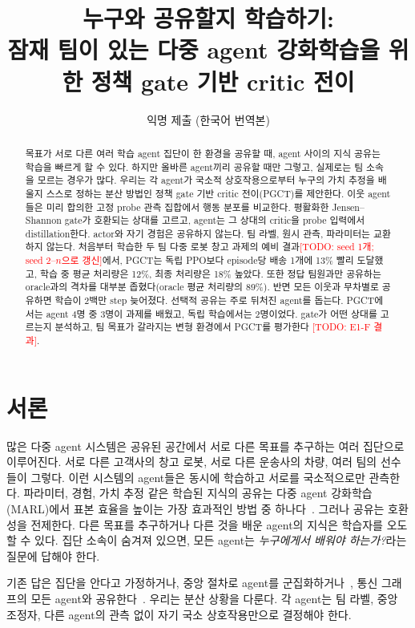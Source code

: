 \documentclass[twocolumn,10pt]{article}
\title{누구와 공유할지 학습하기:\\ 잠재 팀이 있는 다중 agent 강화학습을 위한 정책 gate 기반 critic 전이}
\author{익명 제출 (한국어 번역본)}
\date{}
\newcommand{\todo}[1]{\textcolor{red}{[TODO: #1]}}
\newcommand{\ours}{PGCT}
\begin{document}
\maketitle

\begin{abstract}
목표가 서로 다른 여러 학습 agent 집단이 한 환경을 공유할 때, agent 사이의 지식 공유는 학습을 빠르게 할 수 있다.
하지만 올바른 agent끼리 공유할 때만 그렇고, 실제로는 팀 소속을 모르는 경우가 많다. 우리는 각 agent가 국소적
상호작용으로부터 누구의 가치 추정을 배울지 스스로 정하는 분산 방법인 정책 gate 기반 critic 전이(\ours{})를 제안한다.
이웃 agent들은 미리 합의한 고정 probe 관측 집합에서 행동 분포를 비교한다. 평활화한 Jensen--Shannon gate가 호환되는
상대를 고르고, agent는 그 상대의 critic을 probe 입력에서 distillation한다. actor와 자기 경험은 공유하지 않는다. 팀 라벨,
원시 관측, 파라미터는 교환하지 않는다. 처음부터 학습한 두 팀 다중 로봇 창고 과제의 예비 결과\todo{seed 1개; seed 2--$n$으로
갱신}에서, \ours{}는 독립 PPO보다 episode당 배송 1개에 13\% 빨리 도달했고, 학습 중 평균 처리량은 12\%, 최종 처리량은 18\%
높았다. 또한 정답 팀원과만 공유하는 oracle과의 격차를 대부분 좁혔다(oracle 평균 처리량의 89\%). 반면 모든 이웃과 무차별로
공유하면 학습이 2백만 step 늦어졌다. 선택적 공유는 주로 뒤처진 agent를 돕는다. \ours{}에서는 agent 4명 중 3명이 과제를 배웠고,
독립 학습에서는 2명이었다. gate가 어떤 상대를 고르는지 분석하고, 팀 목표가 갈라지는 변형 환경에서 \ours{}를 평가한다
\todo{E1-F 결과}.
\end{abstract}

\section{서론}
많은 다중 agent 시스템은 공유된 공간에서 서로 다른 목표를 추구하는 여러 집단으로 이루어진다. 서로 다른 고객사의 창고
로봇, 서로 다른 운송사의 차량, 여러 팀의 선수들이 그렇다. 이런 시스템의 agent들은 동시에 학습하고 서로를 국소적으로만
관측한다. 파라미터, 경험, 가치 추정 같은 학습된 지식의 공유는 다중 agent 강화학습(MARL)에서 표본 효율을 높이는 가장 효과적인
방법 중 하나다~\cite{christianos2020seac,christianos2021seps}. 그러나 공유는 호환성을 전제한다. 다른 목표를 추구하거나 다른 것을
배운 agent의 지식은 학습자를 오도할 수 있다. 집단 소속이 숨겨져 있으면, 모든 agent는 \emph{누구에게서 배워야 하는가?}라는
질문에 답해야 한다.

기존 답은 집단을 안다고 가정하거나, 중앙 절차로 agent를 군집화하거나~\cite{christianos2021seps,hu2025heterogeneity},
통신 그래프의 모든 agent와 공유한다~\cite{zhang2018networked}. 우리는 분산 상황을 다룬다. 각 agent는 팀 라벨, 중앙 조정자,
다른 agent의 관측 없이 자기 국소 상호작용만으로 결정해야 한다.
\end{document}
